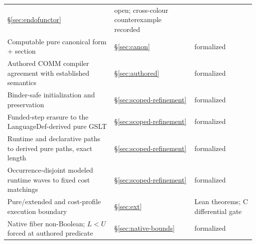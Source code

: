 \documentclass[11pt]{article}
\begin{document}
\begin{center}
\begin{tabularx}{\textwidth}{@{}Xll@{}}
  \S\ref{sec:endofunctor} & open; cross-colour counterexample recorded \\
Computable pure canonical form + section & \S\ref{sec:canon} &
  formalized \\
Authored COMM compiler agreement with established semantics &
  \S\ref{sec:authored} & formalized \\
Binder-safe initialization and preservation &
  \S\ref{sec:scoped-refinement} & formalized \\
Funded-step erasure to the LanguageDef-derived pure GSLT &
  \S\ref{sec:scoped-refinement} & formalized \\
Runtime and declarative paths to derived pure paths, exact length &
  \S\ref{sec:scoped-refinement} & formalized \\
Occurrence-disjoint modeled runtime waves to fixed cost matchings &
  \S\ref{sec:scoped-refinement} & formalized \\
Pure/extended and cost-profile execution boundary & \S\ref{sec:ext} &
  Lean theorems; C differential gate \\
Native fiber non-Boolean; $L<U$ forced at authored predicate &
  \S\ref{sec:native-bounds} & formalized \\
\bottomrule
\end{tabularx}
\end{center}
\end{document}
